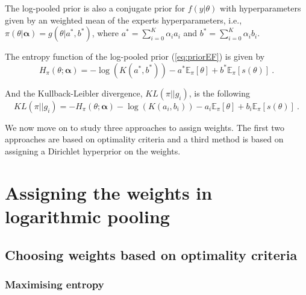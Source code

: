 \documentclass[a4paper, notitlepage, 10pt]{article}
\begin{document}
The log-pooled prior is also a conjugate prior for $f(y|\theta)$ with hyperparameters given by an weighted mean of the experts hyperparameters, i.e., $\pi(\theta|\boldsymbol\alpha) = g(\theta | a^*, b^* )$, where $a^* = \sum_{i=0}^K \alpha_i a_i$ and $b^* = \sum_{i=0}^K \alpha_i b_i$.

The entropy function of the log-pooled prior (\ref{eq:priorEF}) is given by
\begin{equation}
\label{eq:entropypriorEF}
H_\pi(\theta; \boldsymbol\alpha) = - \log (K(a^*, b^*))  -  a^*  \mathbb{E}_\pi[\theta]  +  b^*  \mathbb{E}_\pi[s(\theta)] \: .
\end{equation}

And the Kullback-Leibler divergence, $KL(\pi || g_i )$, is the following
\begin{equation}
\label{eq:KLpriorEF}
KL( \pi || g_i ) = - H_\pi(\theta; \boldsymbol\alpha) - \log( K(a_i,b_i)) - a_i \mathbb{E}_\pi[\theta] + b_i \mathbb{E}_\pi[s(\theta)] \: .
\end{equation}

We now move on to study three approaches to assign weights.
The first two approaches are based on optimality criteria and a third method is based on assigning a Dirichlet hyperprior on the weights.


\section{Assigning the weights in logarithmic pooling}
\label{sec:weights}

\subsection{Choosing weights based on optimality criteria}

\subsubsection{Maximising entropy}
\label{sec:maxent}
\end{document}

